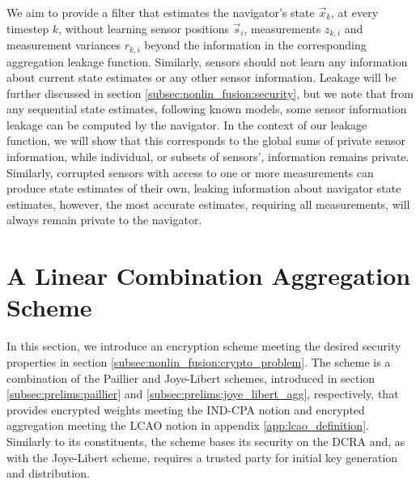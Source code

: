 We aim to provide a filter that estimates the navigator's state $\vec{x}_k$, at every timestep $k$, without learning sensor positions $\vec{s}_i$, measurements $z_{k, i}$ and measurement variances $r_{k, i}$ beyond the information in the corresponding aggregation leakage function. Similarly, sensors should not learn any information about current state estimates or any other sensor information. Leakage will be further discussed in section \ref{subsec:nonlin_fusion:security}, but we note that from any sequential state estimates, following known models, some sensor information leakage can be computed by the navigator. In the context of our leakage function, we will show that this corresponds to the global sums of private sensor information, while individual, or subsets of sensors', information remains private. Similarly, corrupted sensors with access to one or more measurements can produce state estimates of their own, leaking information about navigator state estimates, however, the most accurate estimates, requiring all measurements, will always remain private to the navigator.

% 
%                                
%                                
%                                
% 

\section{A Linear Combination Aggregation Scheme}\label{sec:nonlin_fusion:lcao_scheme}
In this section, we introduce an encryption scheme meeting the desired security properties in section \ref{subsec:nonlin_fusion:crypto_problem}. The scheme is a combination of the Paillier and Joye-Libert schemes, introduced in section \ref{subsec:prelims:paillier} and \ref{subsec:prelims:joye_libert_agg}, respectively, that provides encrypted weights meeting the IND-CPA notion and encrypted aggregation meeting the LCAO notion in appendix \ref{app:lcao_definition}. Similarly to its constituents, the scheme bases its security on the DCRA and, as with the Joye-Libert scheme, requires a trusted party for initial key generation and distribution. 

